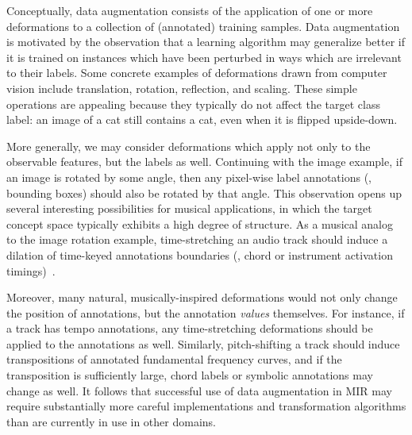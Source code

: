 \documentclass{article}
\begin{document}
Conceptually, data augmentation consists of the application of one or more deformations to
a collection of (annotated) training samples.
Data augmentation is motivated by the observation that a learning algorithm may
generalize better if it is trained on instances which have been perturbed in ways 
which are irrelevant to their labels.
Some concrete examples of deformations drawn from computer vision include translation,
rotation, reflection, and scaling.
These simple operations are appealing because they typically do not affect the target 
class label: an image of a cat still contains a cat, even when it is flipped upside-down.

More generally, we may consider deformations which apply not only to the observable
features, but the labels as well.
Continuing with the image example, if an image is rotated by some angle, 
then any pixel-wise label annotations (\eg, bounding boxes) should also be rotated by
that angle.
This observation opens up several interesting possibilities for musical applications, in
which the target concept space typically exhibits a high degree of structure.
As a musical analog to the image rotation example, time-stretching an audio track 
should induce a dilation of time-keyed annotations boundaries (\eg, chord or instrument
activation timings)~\cite{mauch2013audio}.

Moreover, many natural, musically-inspired deformations
would not only change the position of annotations, but the annotation
\emph{values} themselves.
For instance, if a track has tempo annotations, any time-stretching deformations should
be applied to the annotations as well.
Similarly, pitch-shifting a track should induce transpositions of annotated fundamental
frequency curves, and if the transposition is sufficiently large, chord labels or symbolic 
annotations may change as well.
It follows that successful use of data augmentation in MIR may require
substantially more careful implementations and transformation algorithms than are currently
in use in other domains.
\end{document}
